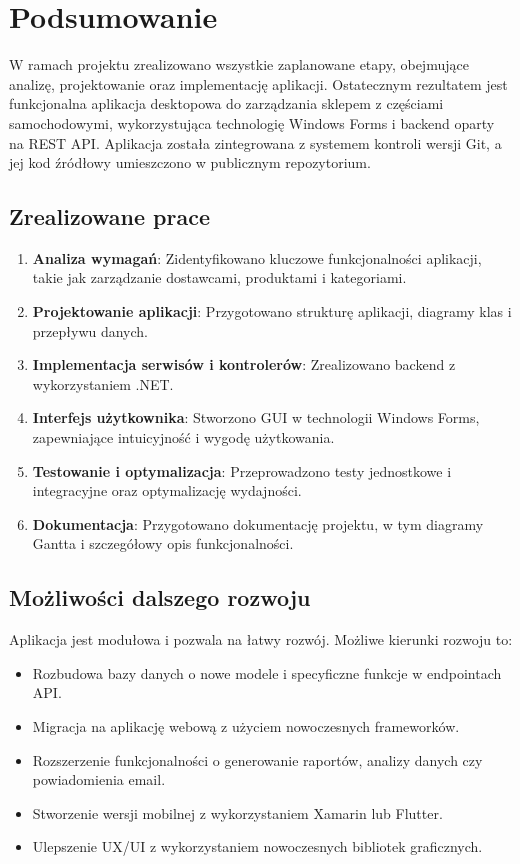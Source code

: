 \chapter{Podsumowanie}

W ramach projektu zrealizowano wszystkie zaplanowane etapy, obejmujące analizę, projektowanie oraz implementację aplikacji. Ostatecznym rezultatem jest funkcjonalna aplikacja desktopowa do zarządzania sklepem z częściami samochodowymi, wykorzystująca technologię Windows Forms i backend oparty na REST API. Aplikacja została zintegrowana z systemem kontroli wersji Git, a jej kod źródłowy umieszczono w publicznym repozytorium.

\section{Zrealizowane prace}
\begin{enumerate}
    \item \textbf{Analiza wymagań}: Zidentyfikowano kluczowe funkcjonalności aplikacji, takie jak zarządzanie dostawcami, produktami i kategoriami.
    \item \textbf{Projektowanie aplikacji}: Przygotowano strukturę aplikacji, diagramy klas i przepływu danych.
    \item \textbf{Implementacja serwisów i kontrolerów}: Zrealizowano backend z wykorzystaniem .NET.
    \item \textbf{Interfejs użytkownika}: Stworzono GUI w technologii Windows Forms, zapewniające intuicyjność i wygodę użytkowania.
    \item \textbf{Testowanie i optymalizacja}: Przeprowadzono testy jednostkowe i integracyjne oraz optymalizację wydajności.
    \item \textbf{Dokumentacja}: Przygotowano dokumentację projektu, w tym diagramy Gantta i szczegółowy opis funkcjonalności.
\end{enumerate}

\section{Możliwości dalszego rozwoju}
Aplikacja jest modułowa i pozwala na łatwy rozwój. Możliwe kierunki rozwoju to:
\begin{itemize}
     \item Rozbudowa bazy danych o nowe modele i specyficzne funkcje w endpointach API.
    \item Migracja na aplikację webową z użyciem nowoczesnych frameworków.
    \item Rozszerzenie funkcjonalności o generowanie raportów, analizy danych czy powiadomienia email.
    \item Stworzenie wersji mobilnej z wykorzystaniem Xamarin lub Flutter.
    \item Ulepszenie UX/UI z wykorzystaniem nowoczesnych bibliotek graficznych.
\end{itemize}

